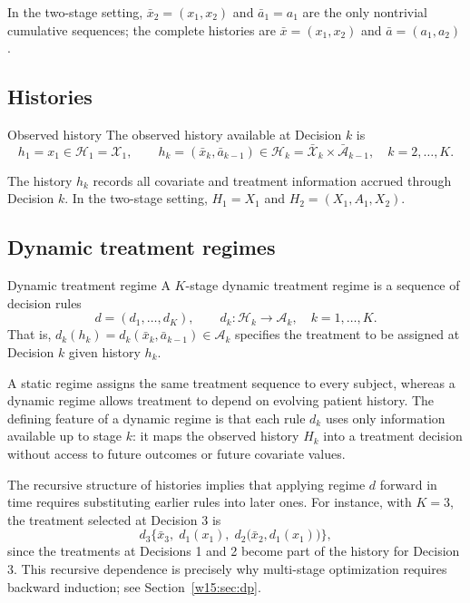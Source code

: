 \documentclass[master.tex]{subfiles}
\begin{document}
In the two-stage setting, $\bar{x}_2 = (x_1, x_2)$ and $\bar{a}_1 = a_1$ are the only nontrivial cumulative sequences; the complete histories are $\bar{x} = (x_1, x_2)$ and $\bar{a} = (a_1, a_2)$.

\subsection{Histories}

\begin{defn}{Observed history}
\label{w15:defn:history}
The observed history available at Decision $k$ is
\[
h_1 = x_1 \in \mathcal{H}_1 = \mathcal{X}_1,
\qquad
h_k = (\bar{x}_k, \bar{a}_{k-1}) \in \mathcal{H}_k = \bar{\mathcal{X}}_k \times \bar{\mathcal{A}}_{k-1},
\quad k = 2,\ldots,K.
\]
\end{defn}

The history $h_k$ records all covariate and treatment information accrued through Decision $k$. In the two-stage setting, $H_1 = X_1$ and $H_2 = (X_1, A_1, X_2)$.

\subsection{Dynamic treatment regimes}

\begin{defn}{Dynamic treatment regime}
\label{w15:defn:dtr}
A $K$-stage dynamic treatment regime is a sequence of decision rules
\[
d = (d_1,\ldots,d_K), \qquad d_k : \mathcal{H}_k \to \mathcal{A}_k, \quad k = 1,\ldots,K.
\]
That is, $d_k(h_k) = d_k(\bar{x}_k, \bar{a}_{k-1}) \in \mathcal{A}_k$ specifies the treatment to be assigned at Decision $k$ given history $h_k$.
\end{defn}

A static regime assigns the same treatment sequence to every subject, whereas a dynamic regime allows treatment to depend on evolving patient history. The defining feature of a dynamic regime is that each rule $d_k$ uses only information available up to stage $k$: it maps the observed history $H_k$ into a treatment decision without access to future outcomes or future covariate values.

\begin{remark}
The recursive structure of histories implies that applying regime $d$ forward in time requires substituting earlier rules into later ones. For instance, with $K = 3$, the treatment selected at Decision 3 is
\[
d_3\bigl\{\bar{x}_3,\; d_1(x_1),\; d_2\bigl(\bar{x}_2, d_1(x_1)\bigr)\bigr\},
\]
since the treatments at Decisions 1 and 2 become part of the history for Decision 3. This recursive dependence is precisely why multi-stage optimization requires backward induction; see Section~\ref{w15:sec:dp}.
\end{remark}
\end{document}
